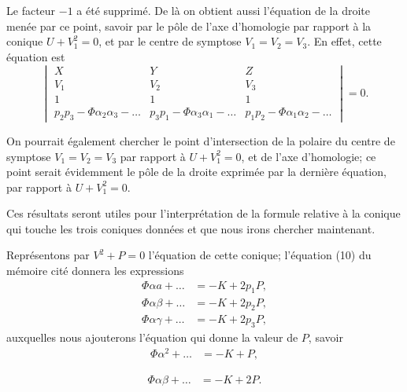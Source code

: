\documentclass[12pt,a4paper]{article}
\theoremstyle{definition}
\begin{document}
Le facteur $-1$ a \'{e}t\'{e} supprim\'{e}. De l\`{a} on obtient aussi l'\'{e}quation de la droite men\'{e}e par ce point, savoir par le p\^{o}le de l'axe d'homologie par rapport \`{a} la conique $U + V_1^2 = 0$, et par le centre de symptose $V_1 = V_2 = V_3$. En effet, cette \'{e}quation est
\begin{equation}\tag{10}
\begin{vmatrix}
X & Y & Z \\
V_1 & V_2 & V_3 \\
1 & 1 & 1 \\
p_2 p_3 - \Phi \alpha_2 \alpha_3 - \ldots & p_3 p_1 - \Phi \alpha_3 \alpha_1 - \ldots & p_1 p_2 - \Phi \alpha_1 \alpha_2 - \ldots
\end{vmatrix} = 0.
\end{equation}

On pourrait \'{e}galement chercher le point d'intersection de la polaire du centre de symptose $V_1 = V_2 = V_3$ par rapport \`{a} $U + V_1^2 = 0$, et de l'axe d'homologie; ce point serait \'{e}videmment le p\^{o}le de la droite exprim\'{e}e par la derni\`{e}re \'{e}quation, par rapport \`{a} $U + V_1^2 = 0$.

Ces r\'{e}sultats seront utiles pour l'interpr\'{e}tation de la formule relative \`{a} la conique qui touche les trois coniques donn\'{e}es et que nous irons chercher maintenant.

Repr\'{e}sentons par $V^2 + P = 0$ l'\'{e}quation de cette conique; l'\'{e}quation (10) du m\'{e}moire cit\'{e} donnera les expressions
\begin{align*}
\Phi \alpha a + \ldots &= -K + 2p_1 P, \\
\Phi \alpha \beta + \ldots &= -K + 2p_2 P, \\
\Phi \alpha \gamma + \ldots &= -K + 2p_3 P,
\end{align*}
auxquelles nous ajouterons l'\'{e}quation qui donne la valeur de $P$, savoir
\begin{align}
\tag{11} \Phi \alpha^2 + \ldots &= -K + P,
\end{align}

\begin{align}
\tag{12} \Phi \alpha \beta + \ldots &= -K + 2P.
\end{align}
\end{document}
